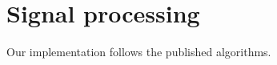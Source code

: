 \documentclass{article}
\begin{document}
\section{Signal processing}
Our implementation follows the published algorithms.
\end{document}
